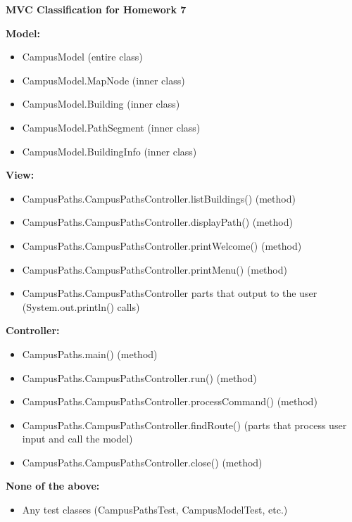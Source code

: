 \documentclass[11pt]{article}
\begin{document}
\begin{center}
\textbf{MVC Classification for Homework 7}
\end{center}

\textbf{Model:}
\begin{itemize}
\item CampusModel (entire class)
\item CampusModel.MapNode (inner class)
\item CampusModel.Building (inner class)
\item CampusModel.PathSegment (inner class)
\item CampusModel.BuildingInfo (inner class)
\end{itemize}

\textbf{View:}
\begin{itemize}
\item CampusPaths.CampusPathsController.listBuildings() (method)
\item CampusPaths.CampusPathsController.displayPath() (method)
\item CampusPaths.CampusPathsController.printWelcome() (method)
\item CampusPaths.CampusPathsController.printMenu() (method)
\item CampusPaths.CampusPathsController parts that output to the user (System.out.println() calls)
\end{itemize}

\textbf{Controller:}
\begin{itemize}
\item CampusPaths.main() (method)
\item CampusPaths.CampusPathsController.run() (method)
\item CampusPaths.CampusPathsController.processCommand() (method)
\item CampusPaths.CampusPathsController.findRoute() (parts that process user input and call the model)
\item CampusPaths.CampusPathsController.close() (method)
\end{itemize}

\textbf{None of the above:}
\begin{itemize}
\item Any test classes (CampusPathsTest, CampusModelTest, etc.)
\end{itemize}
\end{document}
